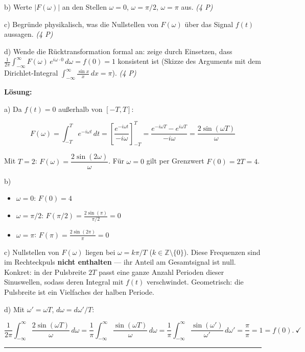 \documentclass[11pt, a4paper]{article}
\begin{document}
b) Werte $|F(\omega)|$ an den Stellen $\omega = 0$, $\omega = \pi/2$, $\omega = \pi$ aus. \textit{(4 P)}


c) Begründe physikalisch, was die Nullstellen von $F(\omega)$ über das Signal $f(t)$ aussagen. \textit{(4 P)}


d) Wende die Rücktransformation formal an: zeige durch Einsetzen, dass $\frac{1}{2\pi}\int_{-\infty}^{\infty} F(\omega)\,e^{i\omega \cdot 0}\,d\omega = f(0) = 1$ konsistent ist (Skizze des Arguments mit dem Dirichlet-Integral $\int_{-\infty}^{\infty} \frac{\sin x}{x}\,dx = \pi$). \textit{(4 P)}


\textbf{Lösung:}


a) Da $f(t) = 0$ außerhalb von $[-T, T]$:

\[
F(\omega) = \int_{-T}^{T} e^{-i\omega t}\,dt = \left[\frac{e^{-i\omega t}}{-i\omega}\right]_{-T}^{T} = \frac{e^{-i\omega T} - e^{i\omega T}}{-i\omega} = \frac{2\sin(\omega T)}{\omega}
\]

Mit $T=2$: $F(\omega) = \dfrac{2\sin(2\omega)}{\omega}$. Für $\omega = 0$ gilt per Grenzwert $F(0) = 2T = 4$.


b)

\begin{itemize}
  \item $\omega = 0$: $F(0) = 4$
  \item $\omega = \pi/2$: $F(\pi/2) = \frac{2\sin(\pi)}{\pi/2} = 0$
  \item $\omega = \pi$: $F(\pi) = \frac{2\sin(2\pi)}{\pi} = 0$
\end{itemize}

c) Nullstellen von $F(\omega)$ liegen bei $\omega = k\pi/T$ ($k\in\mathbb{Z}\setminus\{0\}$). Diese Frequenzen sind im Rechteckpuls \textbf{nicht enthalten} — ihr Anteil am Gesamtsignal ist null. Konkret: in der Pulsbreite $2T$ passt eine ganze Anzahl Perioden dieser Sinuswellen, sodass deren Integral mit $f(t)$ verschwindet. Geometrisch: die Pulsbreite ist ein Vielfaches der halben Periode.


d) Mit $\omega' = \omega T$, $d\omega = d\omega'/T$:

\[
\frac{1}{2\pi}\int_{-\infty}^{\infty} \frac{2\sin(\omega T)}{\omega}\,d\omega = \frac{1}{\pi}\int_{-\infty}^{\infty}\frac{\sin(\omega T)}{\omega}\,d\omega = \frac{1}{\pi}\int_{-\infty}^{\infty}\frac{\sin(\omega')}{\omega'}\,d\omega' = \frac{\pi}{\pi} = 1 = f(0).\ \checkmark
\]



\noindent\textcolor{rulegray}{\rule{\linewidth}{0.4pt}}
\end{document}
